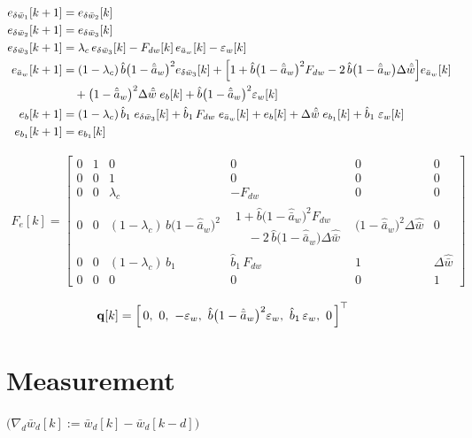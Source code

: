 \documentclass[11pt,a4paper,fontset=none]{ctexart}
\newcommand{\ba}{\bar{a}}
\newcommand{\bw}{\bar{w}}
\newcommand{\dWh}{\Delta\hat{\bw}}
\newcommand{\ah}{\hat{\ba}_w}
\newcommand{\bh}{\hat{b}}
\newcommand{\bhh}{\hat{b}_1}
\newcommand{\ea}{e_{\ba_w}}
\begin{document}
\begin{align*}
e_{\delta\bw_1}[k+1] &= e_{\delta\bw_2}[k] \\
e_{\delta\bw_2}[k+1] &= e_{\delta\bw_3}[k] \\
e_{\delta\bw_3}[k+1] &= \lambda_c\,e_{\delta\bw_3}[k] - F_{dw}[k]\,\ea[k] - \varepsilon_w[k] \\
\ea[k+1] &= (1-\lambda_c)\,\bh\bigl(1-\ah\bigr)^{2}e_{\delta\bw_3}[k]
            + \Bigl[1 + \bh\bigl(1-\ah\bigr)^{2}F_{dw} - 2\,\bh\bigl(1-\ah\bigr)\dWh\Bigr]\ea[k] \\
         &\quad + \bigl(1-\ah\bigr)^{2}\dWh\;e_b[k] + \bh\bigl(1-\ah\bigr)^{2}\varepsilon_w[k] \\
e_b[k+1] &= (1-\lambda_c)\,\bhh\;e_{\delta\bw_3}[k] + \bhh\,F_{dw}\;\ea[k] + e_b[k] + \dWh\;e_{b_1}[k] + \bhh\;\varepsilon_w[k] \\
e_{b_1}[k+1] &= e_{b_1}[k]
\end{align*}

\begin{align*}
F_e[k] = \begin{bmatrix}
0 & 1 & 0 & 0 & 0 & 0 \\[2pt]
0 & 0 & 1 & 0 & 0 & 0 \\[2pt]
0 & 0 & \lambda_c & -F_{dw} & 0 & 0 \\[2pt]
0 & 0 & (1-\lambda_c)\,\bh\bigl(1-\ah\bigr)^{2} &
  \begin{array}{l} 1 + \bh\bigl(1-\ah\bigr)^{2}F_{dw} \\[2pt] \quad - 2\,\bh\bigl(1-\ah\bigr)\dWh \end{array} &
  \bigl(1-\ah\bigr)^{2}\dWh & 0 \\[14pt]
0 & 0 & (1-\lambda_c)\,\bhh & \bhh\,F_{dw} & 1 & \dWh \\[2pt]
0 & 0 & 0 & 0 & 0 & 1
\end{bmatrix}
\end{align*}

\begin{align*}
\mathbf{q}[k] &= \Bigl[\,0,\ 0,\ -\varepsilon_w,\ \bh\bigl(1-\ah\bigr)^{2}\varepsilon_w,\ \bhh\,\varepsilon_w,\ 0\,\Bigr]^{\top}
\end{align*}

\section{Measurement}

$\bigl(\nabla_d\bw_d[k] := \bw_d[k] - \bw_d[k-d]\bigr)$
\end{document}
